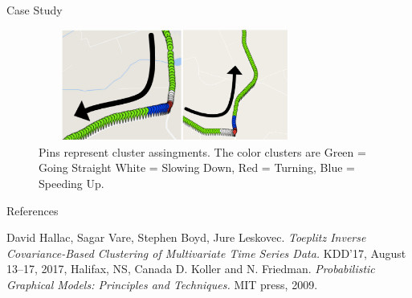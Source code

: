 \documentclass{beamer}
\begin{document}

\begin{frame}{Case Study}
	\begin{figure}
		\centering
		\includegraphics[width=9cm, height=3.67cm]{fig5.eps}
		\caption*{\centering Pins represent cluster assingments. The color clusters are  Green = Going Straight  White = Slowing Down, Red = Turning, Blue = Speeding Up.}
	\end{figure}
\end{frame}


\begin{frame}{References}
\begin{thebibliography}{acm}
	David Hallac, Sagar Vare, Stephen Boyd, Jure Leskovec. \textit{Toeplitz Inverse Covariance-Based Clustering of Multivariate Time Series Data.} KDD’17, August 13–17, 2017, Halifax, NS, Canada
	D. Koller and N. Friedman. \textit{Probabilistic Graphical Models: Principles and Techniques.} MIT press, 2009.
\end{thebibliography}
\end{frame}
\end{document}
